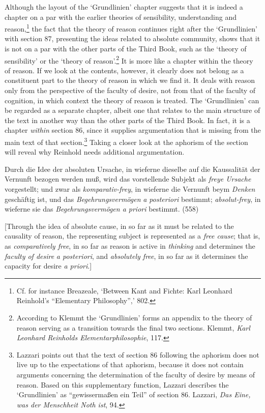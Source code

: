 Although the layout of the `Grundlinien' chapter suggests that it is indeed a chapter on a par with the earlier theories of sensibility, understanding and reason,\footnote{ Cf. for instance Breazeale, `Between Kant and Fichte: Karl Leonhard Reinhold's ``Elementary Philosophy'',' 802. } the fact that the theory of reason continues right after the `Grundlinien' with section 87, presenting the ideas related to absolute community, shows that it is not on a par with the other parts of the Third Book, such as the `theory of sensibility' or the `theory of reason'.\footnote{ According to Klemmt the `Grundlinien' forms an appendix to the theory of reason serving as a transition towards the final two sections. Klemmt, \textit{Karl Leonhard Reinholds Elementarphilosophie}, 117.} It is more like a chapter within the theory of reason. If we look at the contents, however, it clearly does not belong as a constituent part to the theory of reason in which we find it. It deals with reason only from the perspective of the faculty of desire, not from that of the faculty of cognition, in which context the theory of reason is treated. The `Grundlinien' can be regarded as a separate chapter, albeit one that relates to the main structure of the text in another way than the other parts of the Third Book. In fact, it is a chapter \textit{within} section 86, since it supplies argumentation that is missing from the main text of that section.\footnote{\label{footnote:_Ref211748364} Lazzari points out that the text of section 86 following the aphorism does not live up to the expectations of that aphorism, because it does not contain arguments concerning the determination of the faculty of desire by means of reason. Based on this supplementary function, Lazzari describes the `Grundlinien' as ``gewisserma\ss{}en ein Teil'' of section 86. Lazzari, \textit{Das Eine, was der Menschheit Noth ist}, 94.} Taking a closer look at the aphorism of the section will reveal why Reinhold needs additional argumentation. 

Durch die Idee der absoluten Ursache, in wieferne dieselbe auf die Kaussalit\"{a}t der Vernunft bezogen werden mu\ss{}, wird das vorstellende Subjekt als \textit{freye Ursache} vorgestellt; und zwar als \textit{komparativ{-}frey}, in wieferne die Vernunft beym \textit{Denken} gesch\"{a}ftig ist, und das \textit{Begehrungsverm\"{o}gen} \textit{a posteriori} bestimmt; \textit{absolut{-}frey}, in wieferne sie das \textit{Begehrungsverm\"{o}gen a priori} bestimmt. (558) 

[Through the idea of absolute cause, in so far as it must be related to the causality of reason, the representing subject is represented as a \textit{free cause}; that is, as \textit{comparatively free}, in so far as reason is active in \textit{thinking} and determines the \textit{faculty of desire} \textit{a posteriori}, and \textit{absolutely free}, in so far as it determines the capacity for desire \textit{a priori}.]

